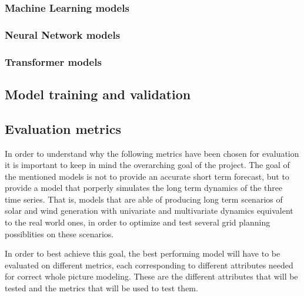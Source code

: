 \subsubsection{Machine Learning models}
\subsubsection{Neural Network models}
\subsubsection{Transformer models}

\subsection{Model training and validation}

\subsection{Evaluation metrics}
In order to understand why the following metrics have been chosen for evaluation it is important to keep in mind the overarching goal of the project. The goal of the mentioned models is not to provide an accurate short term forecast, but to provide a model that porperly simulates the long term dynamics of the three time series. That is, models that are able of producing long term scenarios of solar and wind generation with univariate and multivariate dynamics equivalent to the real world ones, in order to optimize and test several grid planning possiblities on these scenarios. 

In order to best achieve this goal, the best performing model will have to be evaluated on different metrics, each corresponding to different attributes needed for correct whole picture modeling. These are the different attributes that will be tested and the metrics that will be used to test them. 

